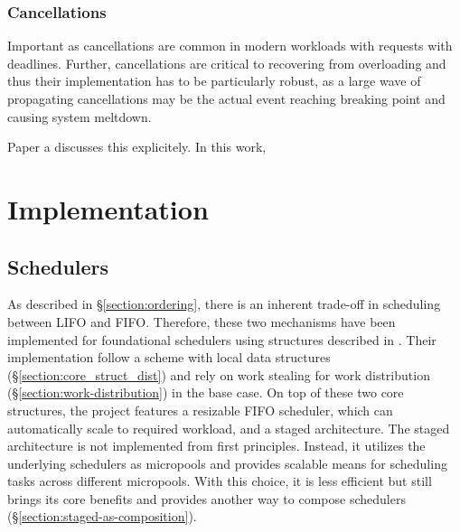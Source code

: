 \documentclass[12pt,a4paper,twoside]{report}
\begin{document}
\subsection{Cancellations}
\label{section:cancellations}
Important as cancellations are common in modern workloads with requests with deadlines. Further, cancellations are critical to recovering from overloading and thus their implementation has to be particularly robust, as a large wave of propagating cancellations may be the actual event reaching breaking point and causing system meltdown.  

Paper a discusses this explicitely. In this work,



\chapter{Implementation}

\section{Schedulers}
\label{section:impl-schedulers}
As described in \S\ref{section:ordering}, there is an inherent trade-off in scheduling between LIFO and FIFO. Therefore, these two mechanisms have been implemented for foundational schedulers using structures described in . Their implementation follow a scheme with local data structures (\S\ref{section:core_struct_dist}) and rely on work stealing for work distribution (\S\ref{section:work-distribution}) in the base case. On top of these two core structures, the project features a resizable FIFO scheduler, which can automatically scale to required workload, and a staged architecture. The staged architecture is not implemented from first principles. Instead, it utilizes the underlying schedulers as micropools and provides scalable means for scheduling tasks across different micropools. With this choice, it is less efficient but still brings its core benefits and provides another way to compose schedulers (\S\ref{section:staged-as-composition}).
\end{document}
